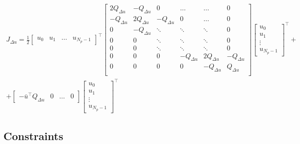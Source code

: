 \documentclass[a4paper,12pt,fleqn]{book}
\newcommand{\Np}{{N_p}}
\begin{document}
\begin{multline}
 J_{\Delta u} = \frac{1}{2}
 \begin{bmatrix}
  u_0 & u_1 &\dots & u_{\Np-1}
 \end{bmatrix}^\top
  \begin{bmatrix}
  2Q_{\Delta u} & -Q_{\Delta u} &0                  & \dots         & \dots  &   0\\
  -Q_{\Delta u} & 2Q_{\Delta u} &-Q_{\Delta u}      &0              & \dots  &   0\\
  0             & -Q_{\Delta u} &\ddots             & \ddots        &\ddots  &   0\\
  0             & 0             &\ddots             & \ddots        &\ddots  &   0\\  
  0             & 0             &\ddots             & \ddots        &\ddots  &   0\\
  0             & 0             &0                  &-Q_{\Delta u}  & 2Q_{\Delta u} &-Q_{\Delta u}\\  
  0             & 0             &0                  &0              & -Q_{\Delta u} &Q_{\Delta u}\\  
  \end{bmatrix}
 \begin{bmatrix}
  u_0 \\  u_1\\ \vdots\\  u_{\Np-1}
 \end{bmatrix}^\top
 + \\
 +
  \begin{bmatrix}
  -{\bar u}^\top Q_{\Delta u} & 0 & \dots  & 0
 \end{bmatrix}
 \begin{bmatrix}
  u_0 \\ u_1 \\ \vdots \\ u_{\Np-1}
 \end{bmatrix}^\top 
 \end{multline} 
\subsection{Constraints}
\end{document}
